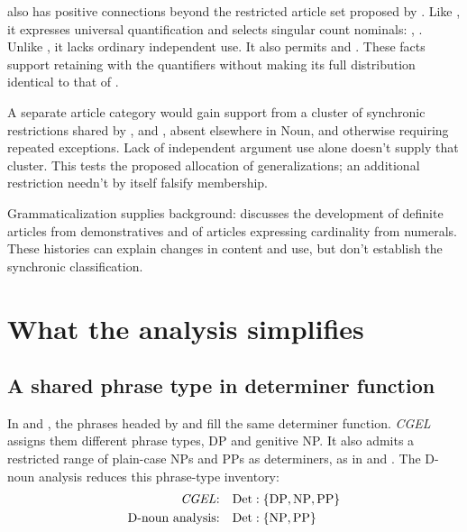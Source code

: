 \documentclass[12pt]{article}
\begin{document}
 also has positive connections beyond the restricted article set proposed by \textcite{spinillo2004reconceptualising}. Like , it expresses universal quantification and selects singular count nominals: , . Unlike , it lacks ordinary independent use. It also permits  and . These facts support retaining  with the quantifiers without making its full distribution identical to that of .

A separate article category would gain support from a cluster of synchronic restrictions shared by ,  and , absent elsewhere in Noun, and otherwise requiring repeated exceptions. Lack of independent argument use alone doesn't supply that cluster. This tests the proposed allocation of generalizations; an additional restriction needn't by itself falsify membership.

Grammaticalization supplies background: \textcite[331--336]{lyons1999} discusses the development of definite articles from demonstratives and of articles expressing cardinality from numerals. These histories can explain changes in content and use, but don't establish the synchronic classification.

\section{What the analysis simplifies}\label{sec:economy}

\subsection{A shared phrase type in determiner function}\label{sec:det-uniform}

In  and , the phrases headed by  and  fill the same determiner function. \textit{CGEL} assigns them different phrase types, DP and genitive NP. It also admits a restricted range of plain-case NPs and PPs as determiners, as in  and  \citep[Ch.~5, §4]{huddleston2002}. The D-noun analysis reduces this phrase-type inventory:
\[
\begin{aligned}
\text{\textit{CGEL}:} &\quad \mathrm{Det}:\{\mathrm{DP},\mathrm{NP},\mathrm{PP}\} \\
\text{D-noun analysis:} &\quad \mathrm{Det}:\{\mathrm{NP},\mathrm{PP}\}
\end{aligned}
\]
\end{document}
